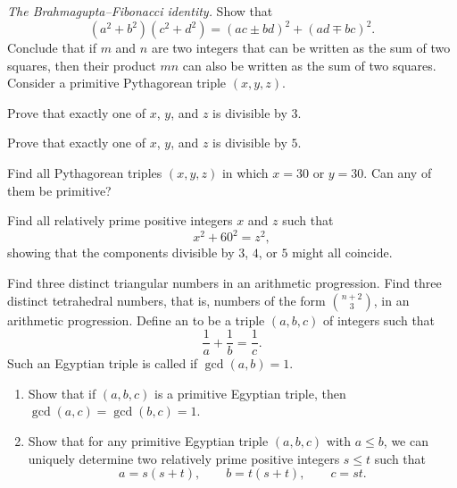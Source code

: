 \begin{routine}
  \exercise \label{exercise:brahmagupta-fibonacci-identity}\emph{The Brahmagupta--Fibonacci identity.} Show that
  \begin{equation*}
    (a^2+b^2)(c^2+d^2)=(ac\pm bd)^2 + (ad\mp bc)^2.
  \end{equation*}
  Conclude that if $m$ and $n$ are two integers that can be written as the sum of two squares, then their product $mn$ can also be written as the sum of two squares.
  \exercise \label{exercise:divisibility-legs-pythagorean-triples}Consider a primitive Pythagorean triple $(x,y,z)$.
  \begin{subexenum}
  \item Prove that exactly one of $x$, $y$, and $z$ is divisible by $3$.
  \item Prove that exactly one of $x$, $y$, and $z$ is divisible by $5$.
  \item Find all Pythagorean triples $(x,y,z)$ in which $x=30$ or $y=30$. Can any of them be primitive?
  \item Find all relatively prime positive integers $x$ and $z$ such that
    \begin{equation*}
      x^2+60^2=z^2,
    \end{equation*}
    showing that the components divisible by $3$, $4$, or $5$ might all coincide.
  \end{subexenum}
  \exercise Find three distinct triangular numbers in an arithmetic progression.
  \exercise Find three distinct tetrahedral numbers, that is, numbers of the form $\binom{n+2}{3}$, in an arithmetic progression.  
  \exercise Define an  to be a triple $(a,b,c)$ of integers such that
  \begin{equation*}
    \frac{1}{a}+\frac{1}{b}=\frac{1}{c}.
  \end{equation*}
  Such an Egyptian triple is called  if $\gcd(a,b)=1$.
  \begin{enumerate}
  \item Show that if $(a,b,c)$ is a primitive Egyptian triple, then $\gcd(a,c)=\gcd(b,c)=1$.
  \item Show that for any primitive Egyptian triple $(a,b,c)$ with $a\leq b$, we can uniquely determine two relatively prime positive integers $s\leq t$ such that
    \begin{equation*}
      a=s(s+t),\qquad b=t(s+t),\qquad c=st.
    \end{equation*}
  \end{enumerate}
\end{routine}

